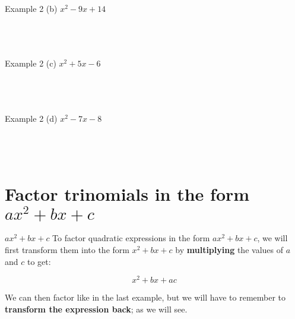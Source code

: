 \documentclass[t]{beamer}
\begin{document}
\begin{frame}{Example 2}
(b) \quad $x^2 - 9x + 14$ \newline\\
 \newline\\
 \newline\\
 \newline\\
\end{frame}

\begin{frame}{Example 2}
(c) \quad $x^2+ 5x - 6$ \newline\\
 \newline\\
 \newline\\
 \newline\\
\end{frame}

\begin{frame}{Example 2}
(d) \quad $x^2 - 7x - 8$ \newline\\
 \newline\\
 \newline\\
 \newline\\
\end{frame}

\section{Factor trinomials in the form $ax^2+bx+c$}

\begin{frame}{$ax^2 + bx + c$}
To factor quadratic expressions in the form $ax^2+bx+c$, we will first \alert{transform} them into the form $x^2+bx+c$ by {\color{blue}\textbf{multiplying}} the values of $a$ and $c$ to get:	\newline\\	\pause

\[x^2 + bx + ac\]	\pause

We can then factor like in the last example, but we will have to remember to \textbf{transform the expression back}; as we will see.
\end{frame}
\end{document}
